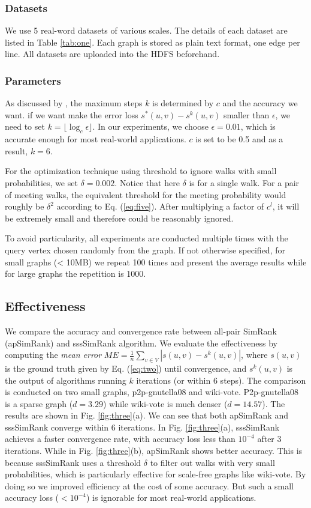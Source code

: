 \documentclass[conference]{IEEEtran}
\theoremstyle{definition}
\theoremstyle{definition}
\begin{document}
\subsubsection{Datasets}
We use 5 real-word datasets of various scales.
The details of each dataset are listed in Table \ref{tab:one}.
Each graph is stored as plain text format,  one edge per line. 
All datasets are uploaded into the HDFS beforehand. 
\subsubsection{Parameters}
As discussed by \cite{lizorkin2008accuracy}, the maximum steps $k$ is determined by $c$ and the accuracy we want.
if we want make the error loss  $s^*(u,v) - s^k(u,v)$ smaller than $\epsilon$, we need to set $k=\lfloor \log_c \epsilon \rfloor$. 
In our experiments, we choose  $\epsilon = 0.01$, which is accurate enough for most real-world applications.
$c$ is set to be 0.5 and as a result,  $k = 6$.

For the optimization technique using threshold to ignore walks with small probabilities, we set $\delta=0.002$.
Notice that here $\delta$ is for a single walk. 
For a pair of meeting walks, the equivalent threshold for the meeting probability would roughly be $\delta^2$ according to Eq. (\ref{eq:five}).
After multiplying a factor of $c^l$,  it will be  extremely small and therefore could be reasonably ignored.

To avoid particularity, all experiments are conducted multiple times with the query vertex chosen randomly from the graph.
If not otherwise specified, for small graphs (< 10MB) we repeat 100 times and present the average results while for large graphs the repetition is 1000.


\subsection{Effectiveness}
We compare the accuracy and convergence rate between all-pair SimRank (apSimRank) and  sssSimRank algorithm.
We  evaluate the effectiveness  by  computing the {\em mean error} $ME = \frac{1}{n}\sum_{v \in V}{|s(u,v) - s^k(u,v)|}$, where $s(u,v)$ is the ground truth given by Eq. (\ref{eq:two}) until convergence, and $s^k(u,v)$ is the output of  algorithms running  $k$ iterations (or within 6 steps). 
The comparison is conducted on two small graphs, p2p-gnutella08 and wiki-vote. 
P2p-gnutella08 is a sparse graph ($d=3.29$) while wiki-vote is much denser ($d=14.57$).
The results are shown in Fig. \ref{fig:three}(a).
We can see that both apSimRank and  sssSimRank converge within 6 iterations.
In Fig. \ref{fig:three}(a), sssSimRank achieves a faster convergence rate, with accuracy loss less than $10^{-4}$ after 3 iterations.   
While in Fig. \ref{fig:three}(b), apSimRank  shows better accuracy.
This is because sssSimRank uses a threshold $\delta$ to filter out walks with very small probabilities, which is particularly effective for scale-free graphs like wiki-vote.
By doing so we  improved efficiency at the cost of  some accuracy.
But such a small accuracy loss ($< 10^{-4}$) is ignorable for most real-world  applications.
\end{document}
